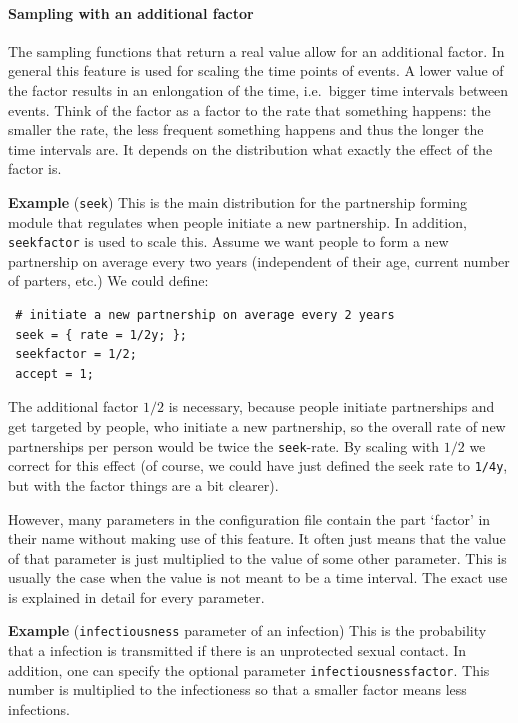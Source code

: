 \documentclass[11pt]{article}
\newenvironment{example}{\par\smallskip\noindent\begingroup\small\textbf{\small Example\enskip}}{\endgroup\par\smallskip}
\begin{document}
\paragraph{Sampling with an additional factor} \label{sssec:factor}

The sampling functions that return a real value allow for an additional factor.
In general this feature is used for scaling the time points of events. A lower
value of the factor results in an enlongation of the time, i.e.\ bigger time
intervals between events. Think of the factor as a factor to the rate that
something happens: the smaller the rate, the less frequent something happens and
thus the longer the time intervals are. It depends on the distribution what
exactly the effect of the factor is. 
\begin{example} (\texttt{seek}) This is the main distribution for the
partnership forming module that regulates when people initiate a new
partnership. In addition, \texttt{seekfactor} is used to scale this. Assume we
want people to form a new partnership on average every two years (independent
of their age, current number of parters, etc.) We could define:
\begin{verbatim}
 # initiate a new partnership on average every 2 years
 seek = { rate = 1/2y; };
 seekfactor = 1/2;
 accept = 1;
\end{verbatim}
The additional factor $1/2$ is necessary, because people initiate partnerships
and get targeted by people, who initiate a new partnership, so the overall
rate of new partnerships per person would be twice the \texttt{seek}-rate. By
scaling with $1/2$ we correct for this effect (of course, we could have just
defined the seek rate to \texttt{1/4y}, but with the factor things are a
bit clearer).
\end{example}

However, many parameters in the configuration file contain the part
`factor' in their name without making use of this feature. It often just means 
that the value of that parameter is just multiplied to
the value of some other parameter. This is usually the case when the value is
not meant to be a time interval. The exact use is explained in detail for every
parameter.
\begin{example} (\texttt{infectiousness} parameter of an
infection) 
This is the probability that a 
infection is transmitted if there is an unprotected sexual contact. In
addition, one can specify the optional parameter \texttt{infectiousnessfactor}.
This number is multiplied to the infectioness so that a smaller factor means
less infections. 
\end{example}
\end{document}
